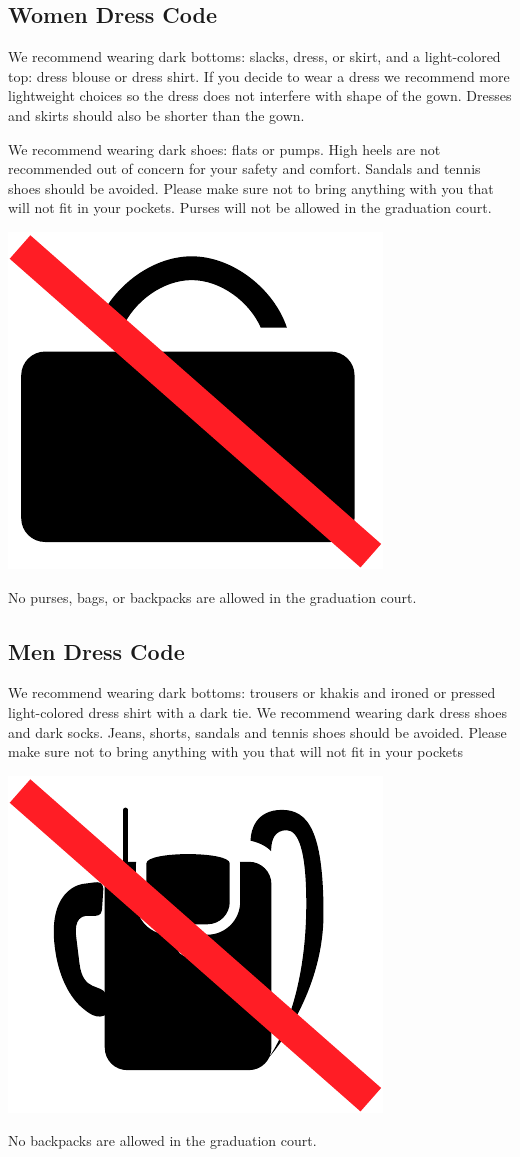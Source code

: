 \documentclass{tufte-handout}
\begin{document}
\subsection{Women Dress Code}
We recommend wearing dark bottoms: slacks, dress, or skirt, and a light-colored top: dress blouse or dress shirt. 
If you decide to wear a dress we recommend more lightweight choices so the dress does not interfere with shape of the gown. Dresses and skirts should also be shorter than the gown.

We recommend wearing dark shoes: flats or pumps. High heels are not recommended out of concern for your safety and comfort. Sandals and tennis shoes should be avoided. Please make sure not to bring anything with you that will not fit in your pockets. Purses will not be allowed in the graduation court.

\begin{marginfigure}[-12\baselineskip]%
\hspace*{0.02in}
  \includegraphics[width=.5\linewidth]{bag}
  \caption{\linespread{1.3}\selectfont{}No purses, bags, or backpacks are allowed in the graduation court.}
  \label{fig:bag}
\end{marginfigure}

\subsection{Men Dress Code}
We recommend wearing dark bottoms: trousers or khakis and ironed or pressed light-colored dress shirt with a dark tie. We recommend wearing dark dress shoes and dark socks. Jeans, shorts, sandals and tennis shoes should be avoided. Please make sure not to bring anything with you that will not fit in your pockets

\begin{marginfigure}[-4\baselineskip]%
\hspace*{0.02in}
  \includegraphics[width=.5\linewidth]{backpack}
  \caption{\linespread{1.3}\selectfont{}No backpacks are allowed in the graduation court.}
  \label{fig:bag}
\end{marginfigure}
\end{document}
